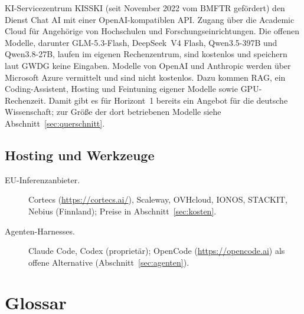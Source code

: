 \documentclass[a4paper,11pt]{article}
\begin{document}
\begin{description}
  KI-Servicezentrum KISSKI (seit November 2022 vom BMFTR gefördert)
  den Dienst Chat AI mit einer OpenAI-kompatiblen API. Zugang über die
  Academic Cloud für Angehörige von Hochschulen und
  Forschungseinrichtungen. Die offenen Modelle, darunter GLM-5.3-Flash,
  DeepSeek~V4 Flash, Qwen3.5-397B und Qwen3.8-27B, laufen im eigenen
  Rechenzentrum, sind kostenlos und speichern laut GWDG keine
  Eingaben. Modelle von OpenAI und Anthropic werden über Microsoft
  Azure vermittelt und sind nicht kostenlos. Dazu kommen RAG,
  ein Coding-Assistent, Hosting und Feintuning eigener Modelle sowie
  GPU-Rechenzeit. Damit gibt es für Horizont~1 bereits ein Angebot für
  die deutsche Wissenschaft; zur Größe der dort betriebenen Modelle
  siehe Abschnitt~\ref{sec:querschnitt}.
\end{description}

\subsection{Hosting und Werkzeuge}

\begin{description}
\item[EU-Inferenzanbieter.] Cortecs (\url{https://cortecs.ai/}),
  Scaleway, OVHcloud, IONOS, STACKIT, Nebius (Finnland); Preise in
  Abschnitt~\ref{sec:kosten}.
\item[Agenten-Harnesses.] Claude Code, Codex (proprietär); OpenCode
  (\url{https://opencode.ai}) als offene Alternative
  (Abschnitt~\ref{sec:agenten}).
\end{description}

\section{Glossar}
\label{sec:glossar}
\end{document}
